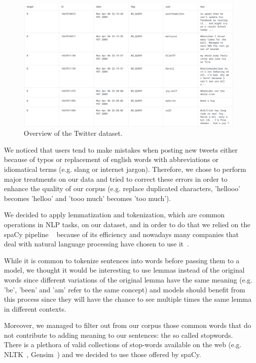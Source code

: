 \documentclass{article}
\begin{document}
    \begin{figure}[h!t]
        \centering
        \includegraphics[scale=0.32]{twitter_overview.png}
        \caption{Overview of the Twitter dataset.}
        \label{fig:TWITTER_OVERVIEW}
    \end{figure}
    
    We noticed that users tend to make mistakes when posting new tweets either because of typos or replacement of english words with abbreviations or idiomatical terms (e.g. slang or internet jargon).
    Therefore, we chose to perform major treatments on our data and tried to correct these errors in order to enhance the quality of our corpus (e.g. replace duplicated characters, 'hellooo' becomes 'helloo' and 'tooo much' becomes 'too much').
    
    We decided to apply lemmatization and tokenization, which are common operations in NLP tasks, on our dataset, and in order to do that we relied on the spaCy pipeline ~\cite{startups:spaCy} because of its efficiency and nowadays many companies that deal with natural language processing have chosen to use it~\cite{data:companies_using_spacy}.
    
    While it is common to tokenize sentences into words before passing them to a model, we thought it would be interesting to use lemmas instead of the original words since different variations of the original lemma have the same meaning (e.g. 'be', 'been' and 'am' refer to the same concept) and models should benefit from this process since they will have the chance to see multiple times the same lemma in different contexts.
    
    Moreover, we managed to filter out from our corpus those common words that do not contribute to adding meaning to our sentences: the so called stopwords.
    There is a plethora of valid collections of stop-words available on the web (e.g. NLTK~\cite{startups:nltk}, Gensim~\cite{startups:gensim}) and we decided to use those offered by spaCy.
    
\end{document}
